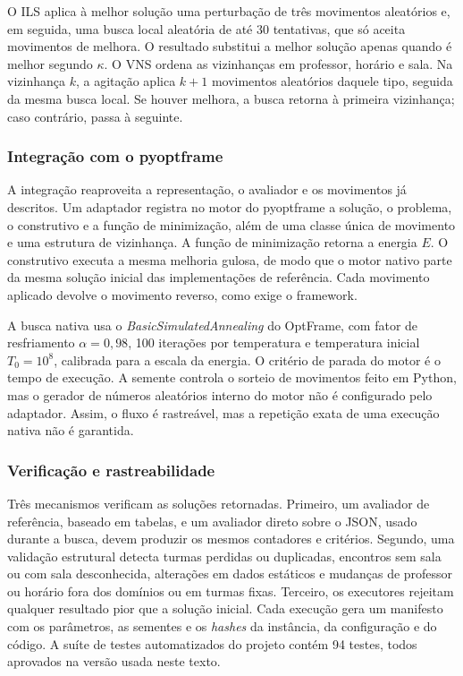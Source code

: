O ILS aplica à melhor solução uma perturbação de três movimentos aleatórios e, em seguida, uma busca local aleatória de até 30 tentativas, que só aceita movimentos de melhora. O resultado substitui a melhor solução apenas quando é melhor segundo $\kappa$. O VNS ordena as vizinhanças em professor, horário e sala. Na vizinhança $k$, a agitação aplica $k+1$ movimentos aleatórios daquele tipo, seguida da mesma busca local. Se houver melhora, a busca retorna à primeira vizinhança; caso contrário, passa à seguinte.

\subsubsection{Integração com o pyoptframe}

A integração reaproveita a representação, o avaliador e os movimentos já descritos. Um adaptador registra no motor do pyoptframe a solução, o problema, o construtivo e a função de minimização, além de uma classe única de movimento e uma estrutura de vizinhança. A função de minimização retorna a energia $E$. O construtivo executa a mesma melhoria gulosa, de modo que o motor nativo parte da mesma solução inicial das implementações de referência. Cada movimento aplicado devolve o movimento reverso, como exige o framework.

A busca nativa usa o \textit{BasicSimulatedAnnealing} do OptFrame, com fator de resfriamento $\alpha=0{,}98$, 100 iterações por temperatura e temperatura inicial $T_0=10^8$, calibrada para a escala da energia. O critério de parada do motor é o tempo de execução. A semente controla o sorteio de movimentos feito em Python, mas o gerador de números aleatórios interno do motor não é configurado pelo adaptador. Assim, o fluxo é rastreável, mas a repetição exata de uma execução nativa não é garantida. 

\subsubsection{Verificação e rastreabilidade}

Três mecanismos verificam as soluções retornadas. Primeiro, um avaliador de referência, baseado em tabelas, e um avaliador direto sobre o JSON, usado durante a busca, devem produzir os mesmos contadores e critérios. Segundo, uma validação estrutural detecta turmas perdidas ou duplicadas, encontros sem sala ou com sala desconhecida, alterações em dados estáticos e mudanças de professor ou horário fora dos domínios ou em turmas fixas. Terceiro, os executores rejeitam qualquer resultado pior que a solução inicial. Cada execução gera um manifesto com os parâmetros, as sementes e os \textit{hashes} da instância, da configuração e do código. A suíte de testes automatizados do projeto contém 94 testes, todos aprovados na versão usada neste texto.
